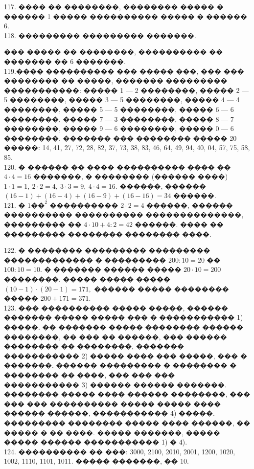 \documentclass[12pt]{article}
\begin{document}
117. ���� �� ��������, �������� ����� � ������ 1 ����� ���������� ����� � ������ 6.\\
118. ��������� ��������� �������.
\begin{center}
\begin{figure}[ht!]
\end{figure}
\end{center}
��� ����� �� ��������, ���������� �� ������� �� 6 �������.\\
119.���� ���������� ��� ����� ���, ��� ��� �������� �� �����, ������� ��������� �����������: ����� 1 --- 2 ��������, ����� 2 --- 5 ��������, ����� 3 --- 5 ��������, ����� 4 --- 4 ��������, ����� 5 --- 5 ��������, ����� 6 --- 6 ��������, ����� 7 --- 3 ��������, ����� 8 --- 7 ��������, ����� 9 --- 6 ��������, ����� 0 --- 6 ��������. ������� ��� �������� ����� 20 �����: 14, 41, 27, 72, 28, 82, 37, 73, 38, 83, 46, 64, 49, 94, 40, 04, 57, 75, 58, 85.\\
120. � ������ �� ���� ���������� ���� �� $4\cdot4=16$ �������, � �������� (������ ����) $1\cdot1=1,\ 2\cdot2=4,\ 3\cdot3=9,\ 4\cdot4=16.$ ������, ������ $(16-1)+(16-4)+(16-9)+(16-16)=34$ ������.\\
121. � $1\text{��}^2$ ���������� $2\cdot2=4$ ������, ������ ���������� ���������� ��������������, ��������� �� $4\cdot10+4:2=42$ ������. ���� �� ��������� �������� �������� ����.
\begin{center}
\begin{figure}[ht!]
\end{figure}
\end{center}
122. � �������� ��������� ��������� ������������� � ��������� $200:10=20$ �� $100:10=10.$ � ������� ������ ����� $20\cdot10=200$ ��������. ����� ����� ����� $(10-1)\cdot(20-1)=171,$ ������ ����� �������� ����� $200+171=371.$\\
123. ��� ���������� ����� �����, ������ ������� ����� ����� ��� � ����������� 1) �����. �� ������� ����� �������� ������ ��������, �� ��� �� ������, ��� ������ �������� �� ��������, ������� ����������� 2) ����� ���� ��� �����, ��� � �������. ������ ��������� � �������� � �������� �� ����, ��� ��� ��� ����������� 3) ������ ������ �������. �������� ����� ���� ������ ��������, ��� ��� ��� ���������� ����� ����� ���� ������ ������, ����������� 4) �����. ��������� �������� ����� ���� ������, �� ����� � �� ����. ����� �������, ����� ����� ������ ����������� 1) � 4).\\
124. ���������� �� ���: 3000, 2100, 2010, 2001, 1200, 1020, 1002, 1110, 1101, 1011. ����� �������, �� 10.\\
\end{document}
